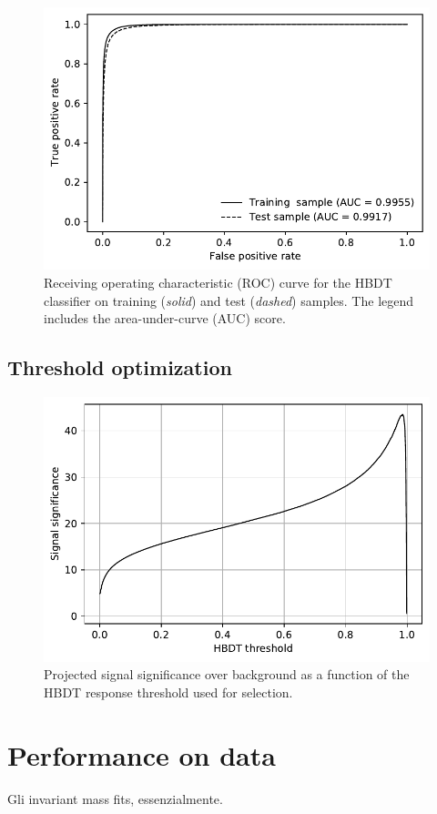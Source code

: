 \begin{figure}
	\centering
	\includegraphics[width=.6\textwidth]{graphics/04-event_selection/roc.pdf}
	\caption{Receiving operating characteristic (ROC) curve for the HBDT classifier on training (\textit{solid}) and test (\textit{dashed}) samples. The legend includes the area-under-curve (AUC) score.}
\end{figure}

\subsection{Threshold optimization}

\begin{figure}
	\centering
	\includegraphics[width=.6\textwidth]{graphics/04-event_selection/HBDT_signal_significance.pdf}
	\caption{Projected \demonstratorshort signal significance over background as a function of the HBDT response threshold used for selection.}
\end{figure}

\section{Performance on data}
Gli invariant mass fits, essenzialmente.


